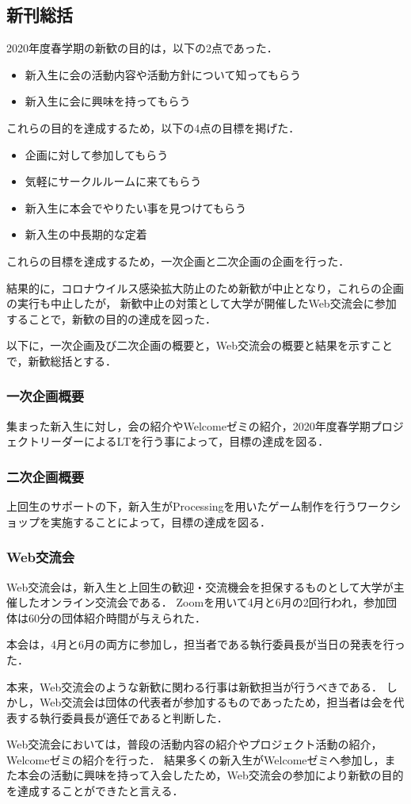 \subsection*{新刊総括}


2020年度春学期の新歓の目的は，以下の2点であった．

\begin{itemize}
    \item 新入生に会の活動内容や活動方針について知ってもらう
    \item 新入生に会に興味を持ってもらう
\end{itemize}

これらの目的を達成するため，以下の4点の目標を掲げた．

\begin{itemize}
    \item 企画に対して参加してもらう
    \item 気軽にサークルルームに来てもらう
    \item 新入生に本会でやりたい事を見つけてもらう
    \item 新入生の中長期的な定着
\end{itemize}

これらの目標を達成するため，一次企画と二次企画の企画を行った．

結果的に，コロナウイルス感染拡大防止のため新歓が中止となり，これらの企画の実行も中止したが，
新歓中止の対策として大学が開催したWeb交流会に参加することで，新歓の目的の達成を図った．

以下に，一次企画及び二次企画の概要と，Web交流会の概要と結果を示すことで，新歓総括とする．

\subsubsection*{一次企画概要}
集まった新入生に対し，会の紹介やWelcomeゼミの紹介，2020年度春学期プロジェクトリーダーによるLTを行う事によって，目標の達成を図る．

\subsubsection*{二次企画概要}
上回生のサポートの下，新入生がProcessingを用いたゲーム制作を行うワークショップを実施することによって，目標の達成を図る．

\subsubsection*{Web交流会}
Web交流会は，新入生と上回生の歓迎・交流機会を担保するものとして大学が主催したオンライン交流会である．
Zoomを用いて4月と6月の2回行われ，参加団体は60分の団体紹介時間が与えられた．

本会は，4月と6月の両方に参加し，担当者である執行委員長が当日の発表を行った．

本来，Web交流会のような新歓に関わる行事は新歓担当が行うべきである．
しかし，Web交流会は団体の代表者が参加するものであったため，担当者は会を代表する執行委員長が適任であると判断した．

Web交流会においては，普段の活動内容の紹介やプロジェクト活動の紹介，Welcomeゼミの紹介を行った．
結果多くの新入生がWelcomeゼミへ参加し，また本会の活動に興味を持って入会したため，Web交流会の参加により新歓の目的を達成することができたと言える．
